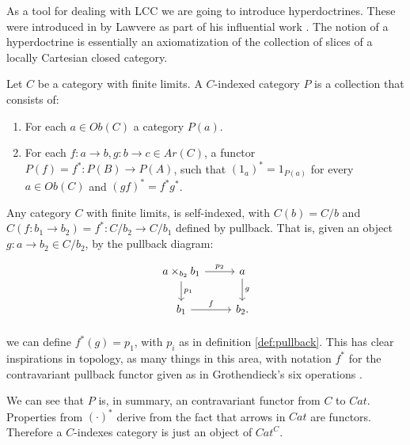 As a tool for dealing with LCC we are going to introduce hyperdoctrines. These were introduced in by Lawvere as part of his influential work \cite{lawvere1969adjointness}. The notion of a hyperdoctrine is essentially an axiomatization of the collection of slices of a locally Cartesian closed category\cite{nlab:hyperdoctrine}.

\begin{definition}
  Let $C$ be a category with finite limits. A $C$-indexed category $P$ is a collection that  consists of:
  \begin{enumerate}
  \item For each $a\in Ob(C)$  a category $P(a)$.
  \item For each $f:a\to b, g:b\to c\in Ar(C)$, a functor $P(f) = f^*:P(B) \to P(A)$, such that $(1_a)^* = 1_{P(a)}$ for every  $a \in Ob(C)$ and $(gf)^*= f^*g^*$.
  \end{enumerate}
\end{definition}
\begin{remark}
  Any category $C$ with finite limits, is self-indexed, with $C(b)=C/b$ and $C(f:b_1\to b_2)=f^*: C/b_2 \to C/b_1$ defined by pullback. That is, given an object $g:a\to b_2 \in C/b_2$, by the pullback diagram:
  \[
    \begin{tikzpicture}
      \node {\begin{tikzcd}
          a \times_{b_2} b_1 \ar[r,"p_2"]\ar[d,"p_1"] & a\ar[d,"g"]\\
          b_1\ar[r,"f"] & b_2.
        \end{tikzcd}};
    \end{tikzpicture}
  \]

  we can define $f^*(g) = p_1$, with $p_i$ as in definition \ref{def:pullback}. This has clear inspirations in topology, as many things in this area, with notation $f^*$ for the contravariant pullback functor given as in Grothendieck's six operations \cite{nlab:six_operations}.\\
\end{remark}

We can see that $P$ is, in summary, an contravariant functor from $C$ to $Cat$. Properties from $(\cdot)^*$ derive from the fact that arrows in $Cat$ are functors. Therefore a $C$-indexes category is just an object of $Cat^C$.\\

